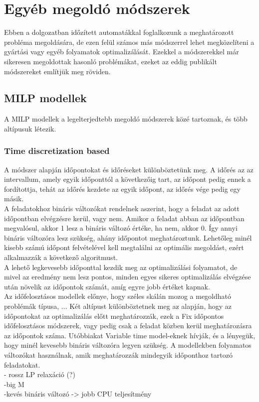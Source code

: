 \documentclass {report}
\begin{document}
  \section{Egyéb megoldó módszerek}
  Ebben a dolgozatban időzített automatákkal foglalkozunk a meghatározott probléma megoldására, de ezen felül számos más módszerrel lehet megközelíteni a gyártási vagy egyéb folyamatok optimalizálását. Ezekkel a módszerekkel már sikeresen megoldottak hasonló problémákat, ezeket az eddig publikált módszereket említjük meg röviden.
  \subsection{MILP modellek}
  A MILP modellek a legelterjedtebb megoldó módszerek közé tartoznak, és több altípusuk létezik.
  \subsubsection{Time discretization based}
  A módszer alapján időpontokat és időréseket különböztetünk meg. A időrés az az intervallum, amely egyik időponttól a következőig tart, az időpont pedig ennek a fordítottja, tehát az időrés kezdete az egyik időpont, az időrés vége pedig egy másik. \\
  A feladatokhoz bináris változókat rendelnek aszerint, hogy a feladat az adott időpontban elvégzésre kerül, vagy nem. Amikor a feladat abban az időpontban megvalósul, akkor 1 lesz a bináris változó értéke, ha nem, akkor 0. Így annyi bináris változóra lesz szükség, ahány időpontot meghatároztunk. Lehetőleg minél kisebb számú időpont felvételével kell megtalálni az optimális megoldást, ezért alkalmazzák a következő algoritmust.
  \\A lehető legkevesebb időponttal kezdik meg az optimalizálási folyamatot, de mivel az eredmény nem lesz pontos, minden egyes sikeres optimalizálás elvégzése után növelik az időpontok számát, amíg egyre jobb értéket kapnak. \\
  Az időfelosztásos modellek előnye, hogy széles skálán mozog a megoldható problémák típusa, ...
 Két altípust különböztetnek meg az alapján, hogy az időpontokat az optimalizálás előtt meghatározzák, ezek a Fix időpontos időfelosztásos módszerek, vagy pedig csak a feladat közben kerül meghatározásra az időpontok száma. Utóbbiakat Variable time model-eknek hívják, és a lényegük, hogy minél kevesebb bináris változóra legyen szükség. A modellekben folyamatos változókat használnak, amik meghatározzák mindegyik időponthoz tartozó feladatokat. 
 \\- rossz LP relaxáció (?)
 \\-big M
 \\-kevés bináris változó -> jobb CPU teljesítmény
  
\end{document}
